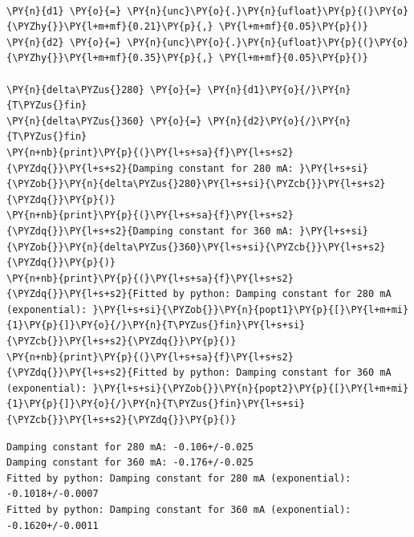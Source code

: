     \begin{center}
    \end{center}
    { \hspace*{\fill} \\}
    
    \begin{tcolorbox}[breakable, size=fbox, boxrule=1pt, pad at break*=1mm,colback=cellbackground, colframe=cellborder]
\begin{Verbatim}[commandchars=\\\{\}]
\PY{n}{d1} \PY{o}{=} \PY{n}{unc}\PY{o}{.}\PY{n}{ufloat}\PY{p}{(}\PY{o}{\PYZhy{}}\PY{l+m+mf}{0.21}\PY{p}{,} \PY{l+m+mf}{0.05}\PY{p}{)}
\PY{n}{d2} \PY{o}{=} \PY{n}{unc}\PY{o}{.}\PY{n}{ufloat}\PY{p}{(}\PY{o}{\PYZhy{}}\PY{l+m+mf}{0.35}\PY{p}{,} \PY{l+m+mf}{0.05}\PY{p}{)}

\PY{n}{delta\PYZus{}280} \PY{o}{=} \PY{n}{d1}\PY{o}{/}\PY{n}{T\PYZus{}fin}
\PY{n}{delta\PYZus{}360} \PY{o}{=} \PY{n}{d2}\PY{o}{/}\PY{n}{T\PYZus{}fin}
\PY{n+nb}{print}\PY{p}{(}\PY{l+s+sa}{f}\PY{l+s+s2}{\PYZdq{}}\PY{l+s+s2}{Damping constant for 280 mA: }\PY{l+s+si}{\PYZob{}}\PY{n}{delta\PYZus{}280}\PY{l+s+si}{\PYZcb{}}\PY{l+s+s2}{\PYZdq{}}\PY{p}{)}
\PY{n+nb}{print}\PY{p}{(}\PY{l+s+sa}{f}\PY{l+s+s2}{\PYZdq{}}\PY{l+s+s2}{Damping constant for 360 mA: }\PY{l+s+si}{\PYZob{}}\PY{n}{delta\PYZus{}360}\PY{l+s+si}{\PYZcb{}}\PY{l+s+s2}{\PYZdq{}}\PY{p}{)}
\PY{n+nb}{print}\PY{p}{(}\PY{l+s+sa}{f}\PY{l+s+s2}{\PYZdq{}}\PY{l+s+s2}{Fitted by python: Damping constant for 280 mA (exponential): }\PY{l+s+si}{\PYZob{}}\PY{n}{popt1}\PY{p}{[}\PY{l+m+mi}{1}\PY{p}{]}\PY{o}{/}\PY{n}{T\PYZus{}fin}\PY{l+s+si}{\PYZcb{}}\PY{l+s+s2}{\PYZdq{}}\PY{p}{)}
\PY{n+nb}{print}\PY{p}{(}\PY{l+s+sa}{f}\PY{l+s+s2}{\PYZdq{}}\PY{l+s+s2}{Fitted by python: Damping constant for 360 mA (exponential): }\PY{l+s+si}{\PYZob{}}\PY{n}{popt2}\PY{p}{[}\PY{l+m+mi}{1}\PY{p}{]}\PY{o}{/}\PY{n}{T\PYZus{}fin}\PY{l+s+si}{\PYZcb{}}\PY{l+s+s2}{\PYZdq{}}\PY{p}{)}
\end{Verbatim}
\end{tcolorbox}

    \begin{Verbatim}[commandchars=\\\{\}]
Damping constant for 280 mA: -0.106+/-0.025
Damping constant for 360 mA: -0.176+/-0.025
Fitted by python: Damping constant for 280 mA (exponential): -0.1018+/-0.0007
Fitted by python: Damping constant for 360 mA (exponential): -0.1620+/-0.0011
    \end{Verbatim}

